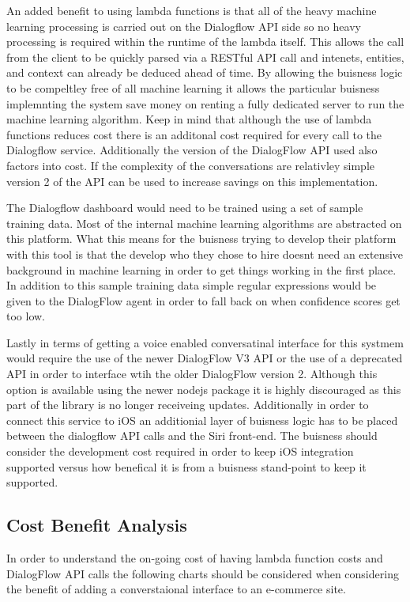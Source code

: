 \documentclass[9pt,software]{livecoms}
\begin{document}
An added benefit to using lambda functions is that all of the heavy machine learning processing is carried out on the Dialogflow API side so no heavy
processing is required within the runtime of the lambda itself. This allows the call from the client to be quickly parsed via a RESTful API call and 
intenets, entities, and context can already be deduced ahead of time. By allowing the buisness logic to be compeltley free of all machine learning it allows
the particular buisness implemnting the system save money on renting a fully dedicated server to run the machine learning algorithm. Keep in mind that although
the use of lambda functions reduces cost there is an additonal cost required for every call to the Dialogflow service. Additionally the version of the DialogFlow API 
used also factors into cost. If the complexity of the conversations are relativley simple version 2 of the API can be used to increase savings on this implementation.

The Dialogflow dashboard would need to be trained using a set of sample training data. Most of the internal machine learning algorithms are abstracted on this platform. 
What this means for the buisness trying to develop their platform with this tool is that the develop who they chose to hire doesnt need an extensive background in machine
learning in order to get things working in the first place. In addition to this sample training data simple regular expressions would be given to the DialogFlow agent in order
to fall back on when confidence scores get too low. 

Lastly in terms of getting a voice enabled conversatinal interface for this systmem would require the use of the newer DialogFlow V3 API or the use of a deprecated 
API in order to interface wtih the older DialogFlow version 2. Although this option is available using the newer nodejs package it is highly discouraged as this part
of the library is no longer receiveing updates. Additionally in order to connect this service to iOS an additionial layer of buisness logic has to be placed between the 
dialogflow API calls and the Siri front-end. The buisness should consider the development cost required in order to keep iOS integration supported versus how 
benefical it is from a buisness stand-point to keep it supported. 

\subsection{Cost Benefit Analysis}
In order to understand the on-going cost of having lambda function costs and DialogFlow API calls the following charts should be considered when 
considering the benefit of adding a converstaional interface to an e-commerce site. 
\end{document}
